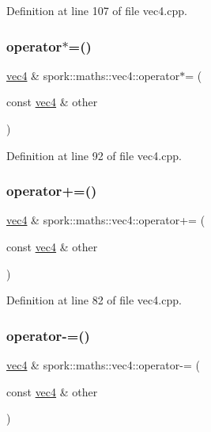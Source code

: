 Definition at line 107 of file vec4.\+cpp.

\mbox{\label{structspork_1_1maths_1_1vec4_a6594a80062b4a298e687358c47d9977d}} 
\subsubsection{\texorpdfstring{operator$\ast$=()}{operator*=()}}
{\footnotesize\ttfamily \hyperlink{structspork_1_1maths_1_1vec4}{vec4} \& spork\+::maths\+::vec4\+::operator$\ast$= (\begin{DoxyParamCaption}\item[{const \hyperlink{structspork_1_1maths_1_1vec4}{vec4} \&}]{other }\end{DoxyParamCaption})}



Definition at line 92 of file vec4.\+cpp.

\mbox{\label{structspork_1_1maths_1_1vec4_afd668c410bc04ce92ca32c3c958ac50d}} 
\subsubsection{\texorpdfstring{operator+=()}{operator+=()}}
{\footnotesize\ttfamily \hyperlink{structspork_1_1maths_1_1vec4}{vec4} \& spork\+::maths\+::vec4\+::operator+= (\begin{DoxyParamCaption}\item[{const \hyperlink{structspork_1_1maths_1_1vec4}{vec4} \&}]{other }\end{DoxyParamCaption})}



Definition at line 82 of file vec4.\+cpp.

\mbox{\label{structspork_1_1maths_1_1vec4_a922dd7709339bb4c26c63878b762737f}} 
\subsubsection{\texorpdfstring{operator-\/=()}{operator-=()}}
{\footnotesize\ttfamily \hyperlink{structspork_1_1maths_1_1vec4}{vec4} \& spork\+::maths\+::vec4\+::operator-\/= (\begin{DoxyParamCaption}\item[{const \hyperlink{structspork_1_1maths_1_1vec4}{vec4} \&}]{other }\end{DoxyParamCaption})}



